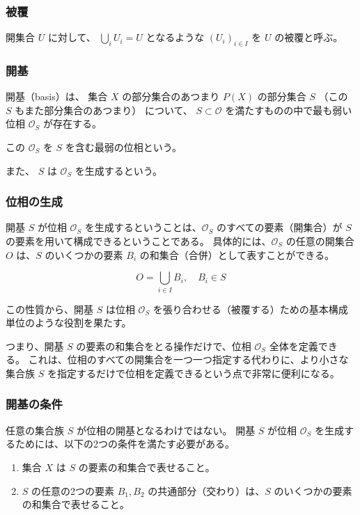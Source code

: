 \documentclass[uplatex,a4j,12pt,dvipdfmx]{jsarticle}
\begin{document}
\subsubsection{被覆}

開集合 $U$ に対して、 $\bigcup_{i} U_{i} = U$ となるような $(U_{i})_{i \in I}$ を $U$ の被覆と呼ぶ。


\subsubsection{開基}

開基（basis）は、
集合 $X$ の部分集合のあつまり $P(X)$ の部分集合 $S$
（この $S$ もまた部分集合のあつまり）
について、
$S \subset {\mathcal O}$
を満たすものの中で最も弱い位相
${\mathcal O}_{S}$
が存在する。

この
${\mathcal O}_{S}$
を
$S$ を含む最弱の位相という。

また、 $S$ は ${\mathcal O}_{S}$ を生成するという。

\subsubsection{位相の生成}

開基 $S$ が位相 $\mathcal{O}_S$ を生成するということは、$\mathcal{O}_S$ のすべての要素（開集合）が $S$ の要素を用いて構成できるということである。
具体的には、$\mathcal{O}_S$ の任意の開集合 $O$ は、$S$ のいくつかの要素 $B_i$ の和集合（合併）として表すことができる。

$$O = \bigcup_{i \in I} B_i, \quad B_i \in S$$

この性質から、開基 $S$ は位相 $\mathcal{O}_S$ を張り合わせる（被覆する）ための基本構成単位のような役割を果たす。

つまり、開基 $S$ の要素の和集合をとる操作だけで、位相 $\mathcal{O}_S$ 全体を定義できる。
これは、位相のすべての開集合を一つ一つ指定する代わりに、より小さな集合族 $S$ を指定するだけで位相を定義できるという点で非常に便利になる。

\subsubsection{開基の条件}

任意の集合族 $S$ が位相の開基となるわけではない。
開基 $S$ が位相 $\mathcal{O}_S$ を生成するためには、以下の2つの条件を満たす必要がある。

\begin{enumerate}
	\item 集合 $X$ は $S$ の要素の和集合で表せること。
	\item $S$ の任意の2つの要素 $B_1, B_2$ の共通部分（交わり）は、$S$ のいくつかの要素の和集合で表せること。
\end{enumerate}
\end{document}
